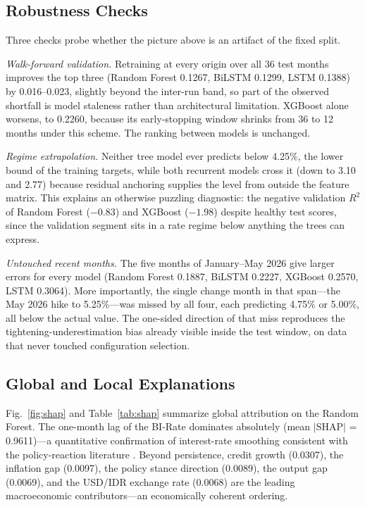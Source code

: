 \documentclass[conference]{IEEEtran}
\begin{document}
\subsection{Robustness Checks}
\label{sec:robust}
Three checks probe whether the picture above is an artifact of the fixed split.

\emph{Walk-forward validation.} Retraining at every origin over all 36 test months improves the top three (Random Forest 0.1267, BiLSTM 0.1299, LSTM 0.1388) by 0.016--0.023, slightly beyond the inter-run band, so part of the observed shortfall is model staleness rather than architectural limitation. XGBoost alone worsens, to 0.2260, because its early-stopping window shrinks from 36 to 12 months under this scheme. The ranking between models is unchanged.

\emph{Regime extrapolation.} Neither tree model ever predicts below 4.25\%, the lower bound of the training targets, while both recurrent models cross it (down to 3.10 and 2.77) because residual anchoring supplies the level from outside the feature matrix. This explains an otherwise puzzling diagnostic: the negative validation $R^2$ of Random Forest ($-0.83$) and XGBoost ($-1.98$) despite healthy test scores, since the validation segment sits in a rate regime below anything the trees can express.

\emph{Untouched recent months.} The five months of January--May 2026 give larger errors for every model (Random Forest 0.1887, BiLSTM 0.2227, XGBoost 0.2570, LSTM 0.3064). More importantly, the single change month in that span---the May 2026 hike to 5.25\%---was missed by all four, each predicting 4.75\% or 5.00\%, all below the actual value. The one-sided direction of that miss reproduces the tightening-underestimation bias already visible inside the test window, on data that never touched configuration selection.

\subsection{Global and Local Explanations}
\label{sec:xai}
Fig.~\ref{fig:shap} and Table~\ref{tab:shap} summarize global attribution on the Random Forest. The one-month lag of the BI-Rate dominates absolutely (mean $|$SHAP$|$ = 0.9611)---a quantitative confirmation of interest-rate smoothing consistent with the policy-reaction literature \cite{clarida1999}. Beyond persistence, credit growth (0.0307), the inflation gap (0.0097), the policy stance direction (0.0089), the output gap (0.0069), and the USD/IDR exchange rate (0.0068) are the leading macroeconomic contributors---an economically coherent ordering.
\end{document}
